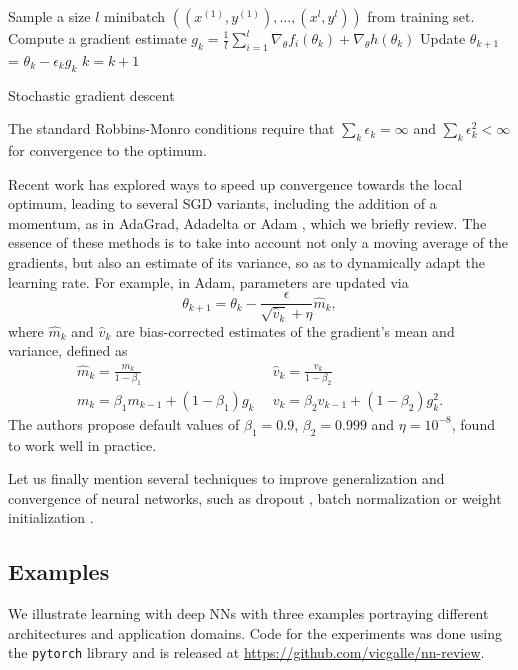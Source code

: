 \begin{algorithm}[!ht]
\begin{algorithmic}
  \State Sample a size $l$ minibatch 
      $((x^{(1)}, y^{(1)}),..., (x^{l},y^{l})) $
              from training set. 
\State Compute a gradient estimate
      $g_k = \frac{1}{l} \sum_{i=1}^l \nabla_{\theta} f_i(\theta_k) + \nabla_{\theta} h(\theta_k)$
\State    Update $\theta_{k+1} $ = $\theta_k -\epsilon _k g_k$ 
\State    $k=k+1$ 
 \EndWhile
\end{algorithmic}
 \caption{Stochastic gradient descent}\label{alg:sgd}
\end{algorithm}

\noindent The standard Robbins-Monro conditions require
that $\sum _k \epsilon_k = \infty$ and 
$\sum _k \epsilon _k^2 < \infty $ for convergence to the optimum.

Recent work has explored ways to 
speed up convergence towards the local optimum, 
leading to several SGD variants, including the 
 addition of a momentum, as in AdaGrad, Adadelta or Adam \parencite{kingma2014adam}, which we briefly review. The essence of these methods is to take into account not only a moving average of the gradients, but also an estimate of its variance, so as to dynamically adapt the learning rate. For example, in Adam, 
  parameters are updated via 
$$
\theta_{k+1} = \theta_k - \frac{\epsilon}{\sqrt{\hat{v}_k} + \eta} \hat{m}_k,
$$
where $\hat{m}_k$ and $\hat{v}_k$ are bias-corrected estimates of the gradient's mean and variance, defined as
\begin{align*}
    \hat{m}_k = \frac{m_k}{1 - \beta_{1}} &  \,\,\, \hat{v}_k = \frac{v_k}{1 - \beta_{2}} \\
    m_k = \beta_1 m_{k-1} + (1 - \beta_1)g_k &  \,\,\, v_k = \beta_2 v_{k-1} + (1 - \beta_2)g_k^2.
\end{align*}
The authors propose default values of $\beta_1 = 0.9$, $\beta_2 = 0.999$ and $\eta = 10^{-8}$, found to work well in practice.


Let us finally mention 
several techniques to improve generalization and convergence of neural networks, such as dropout \parencite{srivastava2014dropout}, batch normalization \parencite{ioffe2015batch} or weight initialization \parencite{glorot2010understanding}.



\subsection{Examples}
We illustrate learning with deep NNs with three examples portraying
different architectures and application domains. Code for the experiments was done using the \texttt{pytorch} library \parencite{torch} and is released at \url{https://github.com/vicgalle/nn-review}.

